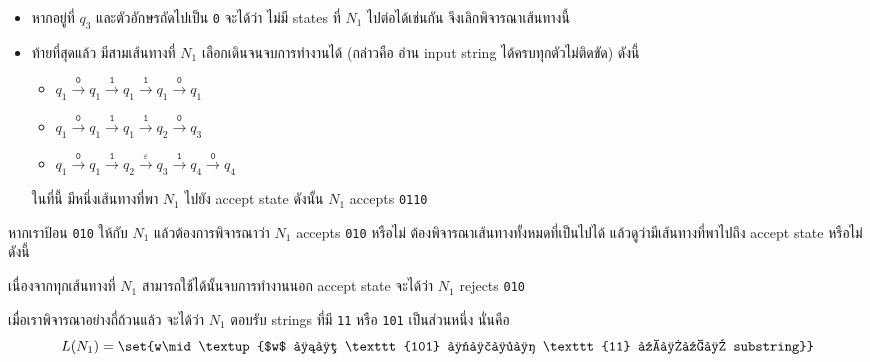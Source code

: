 \begin{example}
\begin{itemize}
\item หากอยู่ที่ $q_3$ และตัวอักษรถัดไปเป็น \texttt{0} จะได้ว่า ไม่มี states ที่ $N_1$ ไปต่อได้เช่นกัน จึงเลิกพิจารณาเส้นทางนี้
\item ท้ายที่สุดแล้ว มีสามเส้นทางที่ $N_1$ เลือกเดินจนจบการทำงานได้ (กล่าวคือ อ่าน input string ได้ครบทุกตัวไม่ติดขัด) ดังนี้
\begin{itemize}
\item $q_1\xrightarrow{\texttt{0}} q_1\xrightarrow{\texttt{1}} q_1\xrightarrow{\texttt{1}} q_1\xrightarrow{\texttt{0}} q_1$ \nay
\item $q_1\xrightarrow{\texttt{0}} q_1\xrightarrow{\texttt{1}} q_1\xrightarrow{\texttt{1}} q_2\xrightarrow{\texttt{0}} q_3$ \nay
\item $q_1\xrightarrow{\texttt{0}} q_1\xrightarrow{\texttt{1}} q_2\xrightarrow{\varepsilon} q_3\xrightarrow{\texttt{1}} q_4\xrightarrow{\texttt{0}} q_4$ \yea
\end{itemize}
ในที่นี้ มีหนึ่งเส้นทางที่พา $N_1$ ไปยัง accept state ดังนั้น $N_1$ accepts \texttt{0110}
\end{itemize}

หากเราป้อน \texttt{010} ให้กับ $N_1$ แล้วต้องการพิจารณาว่า $N_1$ accepts \texttt{010} หรือไม่ ต้องพิจารณาเส้นทางทั้งหมดที่เป็นไปได้ แล้วดูว่ามีเส้นทางที่พาไปถึง accept state หรือไม่ ดังนี้
\begin{center}
\end{center}
เนื่องจากทุกเส้นทางที่ $N_1$ สามารถใช้ได้นั้นจบการทำงานนอก accept state จะได้ว่า $N_1$ rejects \texttt{010}

เมื่อเราพิจารณาอย่างถี่ถ้วนแล้ว จะได้ว่า $N_1$ ตอบรับ strings ที่มี \texttt{11} หรือ \texttt{101} เป็นส่วนหนึ่ง นั่นคือ \[L(N_1)=\set{w\mid\textup{$w$ มี \texttt{101} หรือ \texttt{11} เป็น substring}}\]
\end{example}

